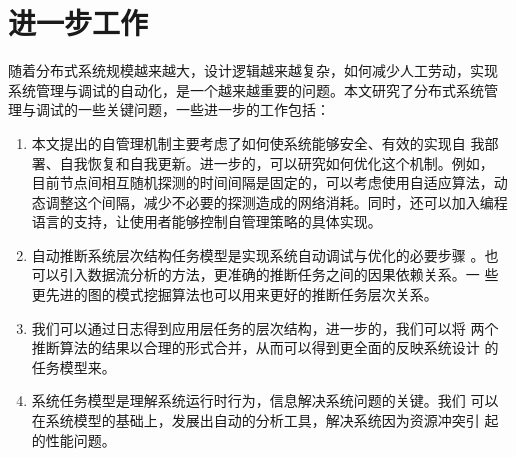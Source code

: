 \section{进一步工作}

随着分布式系统规模越来越大，设计逻辑越来越复杂，如何减少人工劳动，实现
系统管理与调试的自动化，是一个越来越重要的问题。本文研究了分布式系统管
理与调试的一些关键问题，一些进一步的工作包括：

\begin{enumerate}

  \item 本文提出的自管理机制主要考虑了如何使系统能够安全、有效的实现自
  我部署、自我恢复和自我更新。进一步的，可以研究如何优化这个机制。例如，
  目前节点间相互随机探测的时间间隔是固定的，可以考虑使用自适应算法，动
  态调整这个间隔，减少不必要的探测造成的网络消耗。同时，还可以加入编程
  语言的支持，让使用者能够控制自管理策略的具体实现。

  \item 自动推断系统层次结构任务模型是实现系统自动调试与优化的必要步骤
  。也可以引入数据流分析的方法，更准确的推断任务之间的因果依赖关系。一
  些更先进的图的模式挖掘算法也可以用来更好的推断任务层次关系。
  
  \item 我们可以通过日志得到应用层任务的层次结构，进一步的，我们可以将
  两个推断算法的结果以合理的形式合并，从而可以得到更全面的反映系统设计
  的任务模型来。

  \item 系统任务模型是理解系统运行时行为，信息解决系统问题的关键。我们
  可以在系统模型的基础上，发展出自动的分析工具，解决系统因为资源冲突引
  起的性能问题。
  
\end{enumerate}
